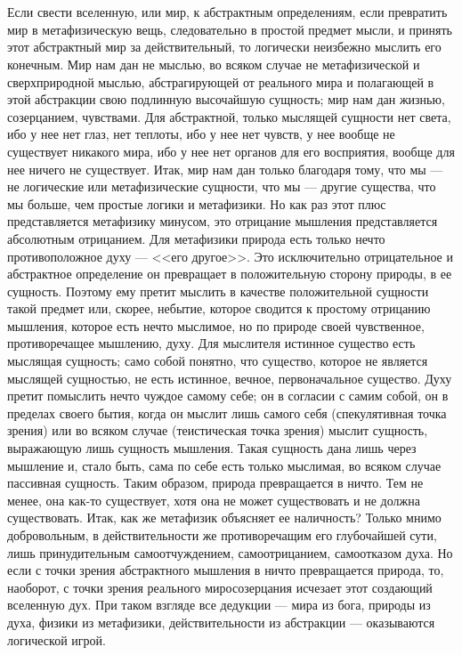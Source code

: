 \documentclass[12pt]{article}
\begin{document}
\section{}

Если свести вселенную, или мир, к абстрактным определениям, если превратить мир в метафизическую вещь, следовательно в простой предмет мысли, и принять этот абстрактный мир за действительный, то логически неизбежно мыслить его конечным. Мир нам дан не мыслью, во всяком случае не метафизической и сверхприродной мыслью, абстрагирующей от реального мира и полагающей в этой абстракции свою подлинную высочайшую сущность; мир нам дан жизнью, созерцанием, чувствами. Для абстрактной, только мыслящей сущности нет света, ибо у нее нет глаз, нет теплоты, ибо у нее нет чувств, у нее вообще не существует никакого мира, ибо у нее нет органов для его восприятия, вообще для нее ничего не существует. Итак, мир нам дан только благодаря тому, что мы --- не логические или метафизические сущности, что мы --- другие существа, что мы больше, чем простые логики и метафизики. Но как раз этот плюс представляется метафизику минусом, это отрицание мышления представляется абсолютным отрицанием. Для метафизики природа есть только нечто противоположное духу --- <<его другое>>. Это исключительно отрицательное и абстрактное определение он превращает в положительную сторону природы, в ее сущность. Поэтому ему претит мыслить в качестве положительной сущности такой предмет или, скорее, небытие, которое сводится к простому отрицанию мышления, которое есть нечто мыслимое, но по природе своей чувственное, противоречащее мышлению, духу. Для мыслителя истинное существо есть мыслящая сущность; само собой понятно, что существо, которое не является мыслящей сущностью, не есть истинное, вечное, первоначальное существо. Духу претит помыслить нечто чуждое самому себе; он в согласии с самим собой, он в пределах своего бытия, когда он мыслит лишь самого себя (спекулятивная точка зрения) или во всяком случае (теистическая точка зрения) мыслит сущность, выражающую лишь сущность мышления. Такая сущность дана лишь через мышление и, стало быть, сама по себе есть только мыслимая, во всяком случае пассивная сущность. Таким образом, природа превращается в ничто. Тем не менее, она как-то существует, хотя она не может существовать и не должна существовать. Итак, как же метафизик объясняет ее наличность? Только мнимо добровольным, в действительности же противоречащим его глубочайшей сути, лишь принудительным самоотчуждением, самоотрицанием, самоотказом духа. Но если с точки зрения абстрактного мышления в ничто превращается природа, то, наоборот, с точки зрения реального миросозерцания исчезает этот создающий вселенную дух. При таком взгляде все дедукции --- мира из бога, природы из духа, физики из метафизики, действительности из абстракции --- оказываются логической игрой.
\end{document}

